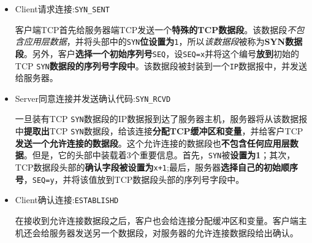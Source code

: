 \documentclass[UTF8,a4paper,12pt]{ctexbook}
\begin{document}
			\begin{itemize}
				\item Client请求连接:\verb|SYN_SENT|
					
					客户端TCP首先给服务器端TCP发送一个\textbf{特殊的TCP数据段}。该数据段\textit{不包含应用层数据}，并将头部中的\verb|SYN|\textbf{位设置为}\verb|1|，所以\textit{该数据段}被称为\textbf{SYN数据段}。另外，客户\textbf{选择一个初始序列号}\verb|SEQ|，设\verb|SEQ=x|并将这个编号\textbf{放到}初始的TCP \verb|SYN|\textbf{数据段的序列号字段中}。该数据段被封装到一个\verb|IP|数据报中，并发送给服务器。
				
				\item Server同意连接并发送确认代码:\verb|SYN_RCVD|
				
					一旦装有TCP \verb|SYN|数据段的IP数据报到达了服务器主机，服务器将从该数据报中\textbf{提取出}TCP \verb|SYN|数据段，给该连接\textbf{分配TCP缓冲区和变量}，并给客户TCP\textbf{发送一个允许连接的数据段}。这个允许连接的数据段也\textbf{不包含任何应用层数据}。但是，它的头部中装载着3个重要信息。首先，\verb|SYN|被\textbf{设置为1}；其次，TCP数据段头部的\textbf{确认字段被设置为}\verb|x+1|;最后，服务器\textbf{选择自己的初始顺序号}，\verb|SEQ=y|，并将该值放到TCP数据段头部的序列号字段中。
					
				\item Client确认连接:\verb|ESTABLISHD|
				
					在接收到允许连接数据段之后，客户也会给连接分配缓冲区和变量。客户端主机还会给服务器发送另一个数据段，对服务器的允许连接数据段给出确认。
					
			\end{itemize}
			
		\newpage
\end{document}
